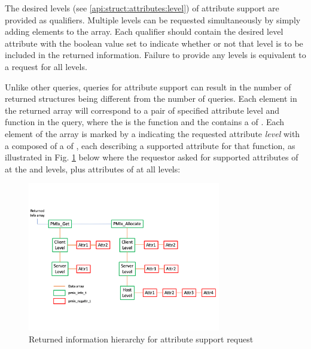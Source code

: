 The desired levels (see \ref{api:struct:attributes:level}) of attribute support are provided as qualifiers. Multiple levels can be requested simultaneously by simply adding elements to the  array. Each qualifier should contain the desired level attribute with the boolean value set to indicate whether or not that level is to be included in the returned information. Failure to provide any levels is equivalent to a request for all levels.

Unlike other queries, queries for attribute support can result in the number of returned  structures being different from the number of queries. Each element in the returned array will correspond to a pair of specified attribute level and function in the query, where the  is the function and the  contains a  of . Each element of the array is marked by a  indicating the requested attribute \emph{level} with a  composed of a  of , each describing a supported attribute for that function, as illustrated in Fig. \ref{fig:attrquery} below where the requestor asked for supported attributes of  at the  and  levels, plus attributes of  at all levels:

\begingroup
\begin{figure}[ht!]
  \begin{center}
    \includegraphics[clip,width=0.75\textwidth]{figs/attrquery.pdf}
  \end{center}
  \caption{Returned information hierarchy for attribute support request}
  \label{fig:attrquery}
\end{figure}
\endgroup


